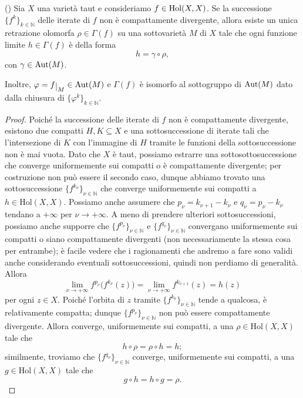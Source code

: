 \begin{thm} \label{retraiii}
    (\cite[Theorem 2.1.5]{A4}) Sia $X$ una varietà taut e consideriamo $f\in\textnormal{Hol}(X,X)$. Se la successione $\{f^k\}_{k\in\mathbb{N}}$ delle iterate di $f$ non è compattamente divergente, allora esiste un unica retrazione olomorfa $\rho\in\Gamma(f)$ su una sottovarietà $M$ di $X$ tale che ogni funzione limite $h\in\Gamma(f)$ è della forma
    $$h=\gamma\circ\rho,$$
    con $\gamma\in\textnormal{Aut}(M)$.

    Inoltre, $\varphi=f\restrict{M}\in\textnormal{Aut}(M)$ e $\Gamma(f)$ è isomorfo al sottogruppo di $\textnormal{Aut}(M)$ dato dalla chiusura di $\{\varphi^k\}_{k \in\mathbb{N}}$.
\end{thm}

\begin{proof}
    Poiché la successione delle iterate di $f$ non è compattamente divergente, esistono due compatti $H,K\subseteq X$ e una sottosuccessione di iterate tali che l'intersezione di $K$ con l'immagine di $H$ tramite le funzioni della sottosuccessione non è mai vuota. Dato che $X$ è taut, possiamo estrarre una sottosottosuccessione che converge uniformemente sui compatti o è compattamente divergente; per costruzione non può essere il secondo caso, dunque abbiamo trovato una sottosuccessione $\{f^{k_{\nu}}\}_{\nu\in\mathbb{N}}$ che converge uniformemente sui compatti a $h\in\text{Hol}(X,X)$. Possiamo anche assumere che $p_\nu=k_{\nu+1}-k_\nu$ e $q_\nu=p_\nu-k_\nu$ tendano a $+\infty$ per $\nu\longrightarrow+\infty$. A meno di prendere ulteriori sottosuccessioni, possiamo anche supporre che $\{f^{p_\nu}\}_{\nu\in\mathbb{N}}$ e $\{f^{q_\nu}\}_{\nu\in\mathbb{N}}$ convergano uniformemente sui compatti o siano compattamente divergenti (non necessariamente la stessa cosa per entrambe); è facile vedere che i ragionamenti che andremo a fare sono validi anche considerando eventuali sottosuccessioni, quindi non perdiamo di generalità. Allora
    $$\lim_{\nu\longrightarrow+\infty}f^{p_\nu}\big(f^{k_\nu}(z)\big)=\lim_{\nu\longrightarrow+\infty}f^{k_{\nu+1}}(z)=h(z)$$
    per ogni $z \in X$. Poiché l'orbita di $z$ tramite $\{f^{k_\nu}\}_{\nu\in\mathbb{N}}$ tende a qualcosa, è relativamente compatta; dunque $\{f^{p_\nu}\}_{\nu\in\mathbb{N}}$ non può essere compattamente divergente. Allora converge, uniformemente sui compatti, a una $\rho\in\text{Hol}(X,X)$ tale che
    \begin{equation} \label{roacca}
        h\circ\rho=\rho\circ h=h;
    \end{equation}
    similmente, troviamo che $\{f^{q_\nu}\}_{\nu\in\mathbb{N}}$ converge, uniformemente sui compatti, a una $g\in\text{Hol}(X,X)$ tale che
    \begin{equation} \label{giacca}
        g\circ h=h\circ g=\rho.
    \end{equation}


\end{proof}
